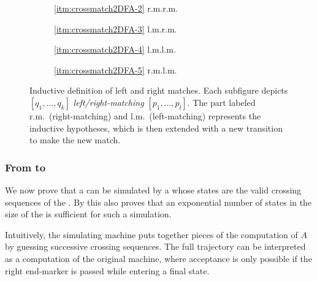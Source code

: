 \begin{figure}
	\centering
	\begin{subfigure}{0.246\textwidth}
		\centering
		
		\caption*{\ref{itm:crossmatch2DFA-2} r.m.\tto r.m.}
	\end{subfigure}
	\hfill
	\begin{subfigure}{0.242\textwidth}
		\centering
		
		\caption*{\ref{itm:crossmatch2DFA-3} l.m.\tto r.m.}
	\end{subfigure}
	\hfill
	\begin{subfigure}{0.242\textwidth}
		\centering
		
		\caption*{\ref{itm:crossmatch2DFA-4} l.m.\tto l.m.}
	\end{subfigure}
	\hfill
	\begin{subfigure}{0.246\textwidth}
		\centering
		
		\caption*{\ref{itm:crossmatch2DFA-5} r.m.\tto l.m.}
	\end{subfigure}
	\caption{Inductive definition of left and right matches. Each subfigure depicts $[q_1,\dots,q_k]$ \emph{left/right-matching} $[p_1,\dots,p_l]$. The part labeled r.m.\ (right-matching) and l.m.\ (left-matching) represents the inductive hypotheses, which is then extended with a new transition to make the new match.}
	\label{fig:2DFA-crossmatch}
\end{figure}

\subsubsection{From \TDFAs to \ONFAs}
We now prove that a \TDFA can be simulated by a \ONFA whose states are the valid crossing sequences of the \TDFA.
By  this also proves that an exponential number of states in the size of the \TDFA is sufficient for such a simulation.

Intuitively, the simulating machine puts together pieces of the computation of $A$ by guessing successive crossing sequences.
The full trajectory can be interpreted as a computation of the original machine, where acceptance is only possible if the right end-marker is passed while entering a final state.

